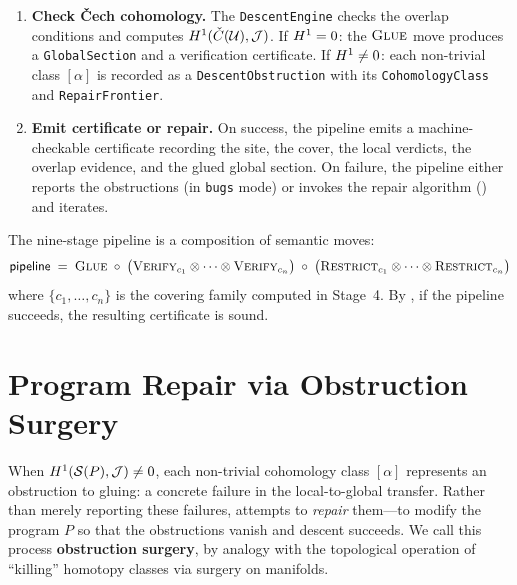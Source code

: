 \begin{enumerate}[label=\textbf{Stage \arabic*.},leftmargin=*]
  \item \textbf{Check \v{C}ech cohomology.}
    The \texttt{DescentEngine} checks the overlap conditions
    and computes $H^{1}(\check{C}(\mathcal{U}), \mathcal{J})$.
    If $H^{1} = 0$: the $\textsc{Glue}$ move produces a
    \texttt{GlobalSection} and a verification certificate.
    If $H^{1} \neq 0$: each non-trivial class $[\alpha]$
    is recorded as a \texttt{DescentObstruction} with its
    \texttt{CohomologyClass} and \texttt{RepairFrontier}.

  \item \textbf{Emit certificate or repair.}
    On success, the pipeline emits a machine-checkable certificate
    recording the site, the cover, the local verdicts, the overlap
    evidence, and the glued global section.  On failure, the pipeline
    either reports the obstructions (in \texttt{bugs} mode) or
    invokes the repair algorithm () and iterates.
\end{enumerate}

\begin{proposition}\label{prop:pipeline}
The nine-stage pipeline is a composition of semantic moves:
\[
  \mathsf{pipeline} \;=\;
  \textsc{Glue} \;\circ\;
  \bigl(\textsc{Verify}_{c_1} \otimes \cdots \otimes \textsc{Verify}_{c_n}\bigr)
  \;\circ\;
  \bigl(\textsc{Restrict}_{c_1} \otimes \cdots \otimes \textsc{Restrict}_{c_n}\bigr)
\]
where $\{c_1, \ldots, c_n\}$ is the covering family computed in
Stage~4.  By , if the pipeline succeeds,
the resulting certificate is sound.
\end{proposition}


\section{Program Repair via Obstruction Surgery}\label{sec:repair}

When $H^{1}(\mathcal{S}(P), \mathcal{J}) \neq 0$, each non-trivial cohomology
class $[\alpha]$ represents an obstruction to gluing: a concrete
failure in the local-to-global transfer.  Rather than merely reporting
these failures, \JuGeo{} attempts to \emph{repair} them---to modify
the program $P$ so that the obstructions vanish and descent succeeds.
We call this process \textbf{obstruction surgery}, by analogy with
the topological operation of ``killing'' homotopy classes via surgery
on manifolds.


